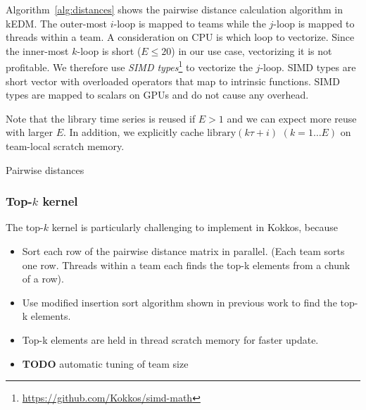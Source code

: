 \documentclass[conference]{IEEEtran}
\begin{document}
Algorithm~\ref{alg:distances} shows the pairwise distance calculation
algorithm in kEDM\@. The outer-most $i$-loop is mapped to teams while the
$j$-loop is mapped to threads within a team. A consideration on CPU is which
loop to vectorize. Since the inner-most $k$-loop is short ($E \leq 20$) in our
use case, vectorizing it is not profitable. We therefore use \textit{SIMD
types}\footnote{\url{https://github.com/Kokkos/simd-math}} to vectorize the
$j$-loop. SIMD types are short vector with overloaded operators that map to
intrinsic functions. SIMD types are mapped to scalars on GPUs and do not cause
any overhead.

Note that the library time series is reused if $E > 1$ and we can expect
more reuse with larger $E$. In addition, we explicitly cache $\mathrm{library}
(k \tau + i)$ $(k=1 \dots E)$ on team-local scratch memory.

\begin{algorithm}
    \SetAlgoLined
    \DontPrintSemicolon
    \caption{Pairwise distances}%
    \label{alg:distances}
\end{algorithm}

\subsubsection{Top-$k$ kernel}

The top-$k$ kernel is particularly challenging to implement in Kokkos, because

\begin{itemize}
\item Sort each row of the pairwise distance matrix in parallel. (Each team sorts one row. Threads within a team each finds the top-k elements from a chunk of a row).
\item Use modified insertion sort algorithm shown in previous work to find the top-k elements.
\item Top-k elements are held in thread scratch memory for faster update.
\item \textbf{TODO} automatic tuning of team size
\end{itemize}
\end{document}
